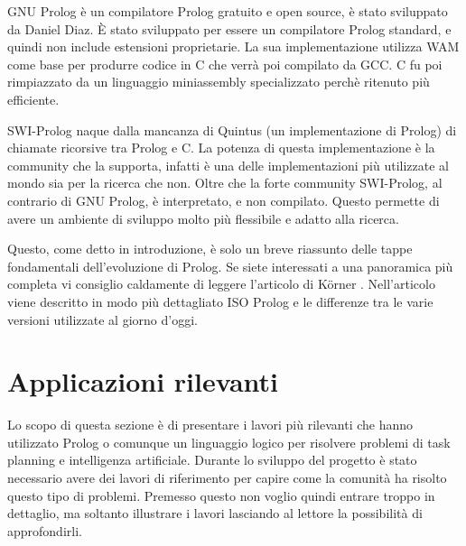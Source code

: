 GNU Prolog è un compilatore Prolog gratuito e open source, è stato sviluppato da Daniel Diaz. È stato sviluppato per essere un compilatore Prolog standard, e quindi non include estensioni proprietarie. La sua implementazione utilizza WAM come base per produrre codice in C che verrà poi compilato da GCC. C fu poi rimpiazzato da un linguaggio miniassembly specializzato
perchè ritenuto più efficiente. 

SWI-Prolog naque dalla mancanza di Quintus (un implementazione di Prolog) di chiamate ricorsive tra Prolog e C. La potenza di questa implementazione è la community che la supporta, infatti è una delle implementazioni più utilizzate al mondo sia per la ricerca che non. Oltre che la forte community
SWI-Prolog, al contrario di GNU Prolog, è interpretato, e non compilato. Questo permette di avere un ambiente di sviluppo molto più flessibile e adatto alla ricerca.

Questo, come detto in introduzione, è solo un breve riassunto delle tappe fondamentali dell'evoluzione di Prolog. Se siete interessati a una panoramica più completa vi consiglio caldamente di leggere l'articolo di K{\"o}rner \cite{korner2022fifty}. 
Nell'articolo viene descritto in modo più dettagliato ISO Prolog e le differenze tra le varie versioni utilizzate al giorno d'oggi.
\section{Applicazioni rilevanti}
\label{sec:lavori}
Lo scopo di questa sezione è di presentare i lavori più rilevanti che hanno utilizzato Prolog o comunque un linguaggio logico per risolvere problemi di task planning e intelligenza artificiale.
Durante lo sviluppo del progetto è stato necessario avere dei lavori di riferimento per capire come la comunità ha risolto questo tipo di problemi.
Premesso questo non voglio quindi entrare troppo in dettaglio, ma soltanto illustrare i lavori lasciando al lettore la possibilità di approfondirli.

